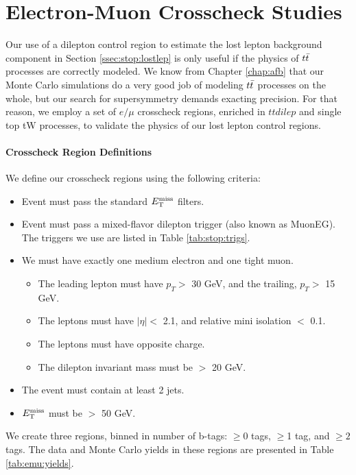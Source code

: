 \chapter{Electron-Muon Crosscheck Studies}
\label{apx:stop:emustudies}

Our use of a dilepton control region to estimate the lost lepton
background component in Section \ref{ssec:stop:lostlep} is only useful
if the physics of $t\bar{t}$
processes are correctly modeled. We know from Chapter \ref{chap:afb}
that our Monte Carlo simulations do a very good job of modeling
$t\bar{t}$ processes on the whole, but our search for supersymmetry
demands exacting precision. For that reason, we employ a set of $e/\mu$
crosscheck regions, enriched in $ttdilep$ and single top tW processes,
to validate the physics of our lost lepton control regions.

\subsubsection{Crosscheck Region Definitions}
\label{sssec:emu:regdefs}

We define our crosscheck regions using the following criteria:
\begin{itemize}
\item Event must pass the standard $E_\text{T}^\text{miss}$ filters.
\item Event must pass a mixed-flavor dilepton trigger (also known as
  MuonEG). The triggers we use are listed in Table
  \ref{tab:stop:trigs}.
\item We must have exactly one medium electron and one tight muon.
  \begin{itemize}
  \item The leading lepton must have $p_T >$ 30 GeV, and the
    trailing, $p_T >$ 15 GeV.
  \item The leptons must have $|\eta| <$ 2.1, and relative mini
    isolation $<$ 0.1.
  \item The leptons must have opposite charge.
  \item The dilepton invariant mass must be $>$ 20 GeV.
  \end{itemize}
\item The event must contain at least 2 jets.
\item $E_\text{T}^\text{miss}$ must be $>$ 50 GeV.
\end{itemize}
We create three regions, binned in number of b-tags: $\geq$0 tags, $\geq$1 tag,
and $\geq2$ tags. The data and Monte Carlo yields in these regions are
presented in Table \ref{tab:emu:yields}.

